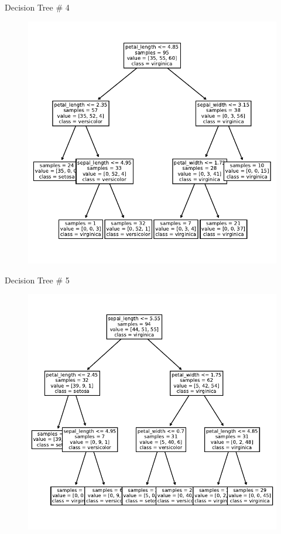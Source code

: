 \documentclass{beamer}
\begin{document}
\begin{frame}{Decision Tree \# 4}
\begin{figure}
\includegraphics[scale=0.7]{tree-4.pdf}
\end{figure}
\end{frame}


\begin{frame}{Decision Tree \# 5}
\begin{figure}
\includegraphics[scale=0.7]{tree-5.pdf}
\end{figure}
\end{frame}
\end{document}

